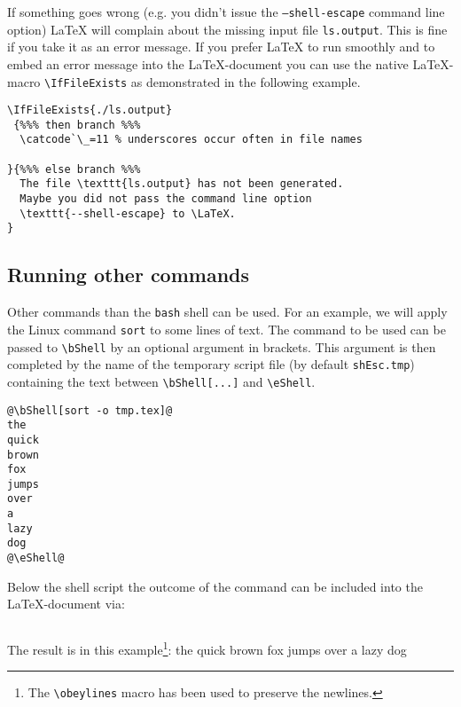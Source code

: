 If something goes wrong (e.g. you didn't issue the
\texttt{--shell-escape} command line option) \LaTeX{} will complain
about the missing input file \texttt{ls.output}. This is fine if you
take it as an error message. If you prefer \LaTeX{} to run smoothly
and to embed an error message into the \LaTeX-document you can use the
native \LaTeX{}-macro \verb=\IfFileExists= as demonstrated in the
following example.
\begin{verbatim}
\IfFileExists{./ls.output}
 {%%% then branch %%%
  \catcode`\_=11 % underscores occur often in file names
  
}{%%% else branch %%%
  The file \texttt{ls.output} has not been generated.
  Maybe you did not pass the command line option
  \texttt{--shell-escape} to \LaTeX.
}
\end{verbatim}

\subsection{Running other commands}
Other commands than the \texttt{bash} shell can be used. For an example, we
will apply the Linux command \texttt{sort} to some lines of text. The
command to be used can be passed to \verb=\bShell= by an optional
argument in brackets. This argument is then completed by the name of
the temporary script file (by default \texttt{shEsc.tmp}) containing
the text between \verb=\bShell[...]= and \verb=\eShell=.  {
  \makeatactive{}
\begin{verbatim}
@\bShell[sort -o tmp.tex]@
the
quick
brown
fox
jumps
over
a
lazy
dog
@\eShell@
\end{verbatim}
}

Below the shell script the outcome of the command can be included into
the \LaTeX-document via:
\begin{verbatim}

\end{verbatim}
The result is in this example\footnote{The \mbox{\tt \textbackslash obeylines} macro has been
  used to preserve the newlines.}:
the
quick
brown
fox
jumps
over
a
lazy
dog
\eShell
{}

